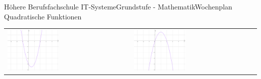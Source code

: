 \documentclass[oneside,openany,headings=optiontotoc,11pt,numbers=noenddot]{scrreprt}
\begin{document}
\begin{worksheet}{Höhere Berufsfachschule IT-Systeme}{Grundstufe - Mathematik}{Wochenplan Quadratische Funktionen}
\begin{framed}
\begin{tabularx}{\textwidth}{XX}
				\includegraphics[width=0.43\textwidth]{../99_Bilder/WP/WP7FrA.png} & \includegraphics[width=0.43\textwidth]{../99_Bilder/wp/WP7FrC.png}\\
			\end{tabularx}
		\end{framed}
	\end{worksheet}
\end{document}
